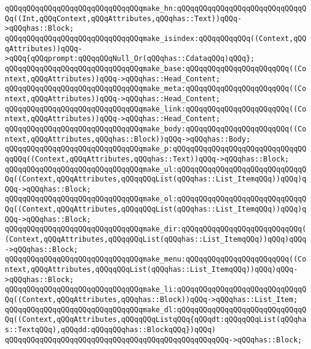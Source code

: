\verb|qQQqqQQqqQQqqQQqqQQqqQQqqQQqqQQqmake_hn:qQQqqQQqqQQqqQQqqQQqqQQqqQQqqQQq((Int,qQQqContext,qQQqAttributes,qQQqhas::Text))qQQq->qQQqhas::Block;|\newline
\verb|qQQqqQQqqQQqqQQqqQQqqQQqqQQqqQQqmake_isindex:qQQqqQQqqQQq((Context,qQQqAttributes))qQQq->qQQq{qQQqprompt:qQQqqQQqNull_Or(qQQqhas::CdataqQQq)qQQq};|\newline
\verb|qQQqqQQqqQQqqQQqqQQqqQQqqQQqqQQqmake_base:qQQqqQQqqQQqqQQqqQQqqQQq((Context,qQQqAttributes))qQQq->qQQqhas::Head_Content;|\newline
\verb|qQQqqQQqqQQqqQQqqQQqqQQqqQQqqQQqmake_meta:qQQqqQQqqQQqqQQqqQQqqQQq((Context,qQQqAttributes))qQQq->qQQqhas::Head_Content;|\newline
\verb|qQQqqQQqqQQqqQQqqQQqqQQqqQQqqQQqmake_link:qQQqqQQqqQQqqQQqqQQqqQQq((Context,qQQqAttributes))qQQq->qQQqhas::Head_Content;|\newline
\verb|qQQqqQQqqQQqqQQqqQQqqQQqqQQqqQQqmake_body:qQQqqQQqqQQqqQQqqQQqqQQq((Context,qQQqAttributes,qQQqhas::Block))qQQq->qQQqhas::Body;|\newline
\verb|qQQqqQQqqQQqqQQqqQQqqQQqqQQqqQQqmake_p:qQQqqQQqqQQqqQQqqQQqqQQqqQQqqQQqqQQq((Context,qQQqAttributes,qQQqhas::Text))qQQq->qQQqhas::Block;|\newline
\verb|qQQqqQQqqQQqqQQqqQQqqQQqqQQqqQQqmake_ul:qQQqqQQqqQQqqQQqqQQqqQQqqQQqqQQq((Context,qQQqAttributes,qQQqqQQqList(qQQqhas::List_ItemqQQq))qQQq)qQQq->qQQqhas::Block;|\newline
\verb|qQQqqQQqqQQqqQQqqQQqqQQqqQQqqQQqmake_ol:qQQqqQQqqQQqqQQqqQQqqQQqqQQqqQQq((Context,qQQqAttributes,qQQqqQQqList(qQQqhas::List_ItemqQQq))qQQq)qQQq->qQQqhas::Block;|\newline
\verb|qQQqqQQqqQQqqQQqqQQqqQQqqQQqqQQqmake_dir:qQQqqQQqqQQqqQQqqQQqqQQqqQQq((Context,qQQqAttributes,qQQqqQQqList(qQQqhas::List_ItemqQQq))qQQq)qQQq->qQQqhas::Block;|\newline
\verb|qQQqqQQqqQQqqQQqqQQqqQQqqQQqqQQqmake_menu:qQQqqQQqqQQqqQQqqQQqqQQq((Context,qQQqAttributes,qQQqqQQqList(qQQqhas::List_ItemqQQq))qQQq)qQQq->qQQqhas::Block;|\newline
\verb|qQQqqQQqqQQqqQQqqQQqqQQqqQQqqQQqmake_li:qQQqqQQqqQQqqQQqqQQqqQQqqQQqqQQq((Context,qQQqAttributes,qQQqhas::Block))qQQq->qQQqhas::List_Item;|\newline
\verb|qQQqqQQqqQQqqQQqqQQqqQQqqQQqqQQqmake_dl:qQQqqQQqqQQqqQQqqQQqqQQqqQQqqQQq((Context,qQQqAttributes,qQQqqQQqListqQQq{qQQqdt:qQQqqQQqList(qQQqhas::TextqQQq),qQQqdd:qQQqqQQqhas::BlockqQQq})qQQq)|\newline
\verb|qQQqqQQqqQQqqQQqqQQqqQQqqQQqqQQqqQQqqQQqqQQqqQQqqQQq->qQQqhas::Block;|\newline
